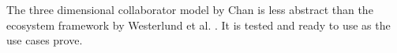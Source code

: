 		The three dimensional collaborator model by Chan is less abstract than the ecosystem framework by Westerlund et al. \cite{westerlund}. It is tested and ready to use as the use cases prove.


